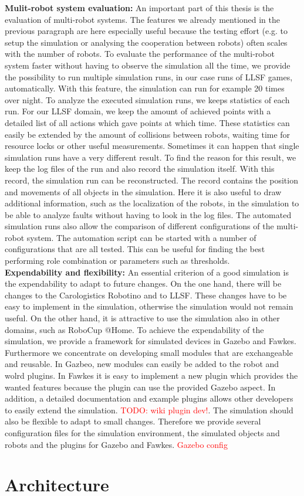 \textbf{Mulit-robot system evaluation:} An important part of this thesis is the evaluation of multi-robot systems. The features we already mentioned in the previous paragraph are here especially useful because the testing effort (e.g. to setup the simulation or analysing the cooperation between robots) often scales with the number of robots. To evaluate the performance of the multi-robot system faster without having to observe the simulation all the time, we provide the possibility to run multiple simulation runs, in our case runs of LLSF games, automatically. With this feature, the simulation can run for example 20 times over night. To analyze the executed simulation runs, we keeps statistics of each run. For our LLSF domain, we keep the amount of achieved points with a detailed list of all actions which gave points at which time. These statistics can easily be extended by the amount of collisions between robots, waiting time for resource locks or other useful measurements. Sometimes it can happen that single simulation runs have a very different result. To find the reason for this result, we keep the log files of the run and also record the simulation itself. With this record, the simulation run can be reconstructed. The record contains the position and movements of all objects in the simulation. Here it is also useful to draw additional information, such as the localization of the robots, in the simulation to be able to analyze faults without having to look in the log files. The automated simulation runs also allow the comparison of different configurations of the multi-robot system. The automation script can be started with a number of configurations that are all tested. This can be useful for finding the best performing role combination or parameters such as thresholds.\\
\textbf{Expendability and flexibility:} An essential criterion of a good simulation is the expendability to adapt to future changes. On the one hand, there will be changes to the Carologistics Robotino and to LLSF. These changes have to be easy to implement in the simulation, otherwise the simulation would not remain useful. On the other hand, it is attractive to use the simulation also in other domains, such as RoboCup @Home. To achieve the expendability of the simulation, we provide a framework for simulated devices in Gazebo and Fawkes. Furthermore we concentrate on developing small modules that are exchangeable and reusable. In Gazbeo, new modules can easily be added to the robot and wolrd plugins. In Fawkes it is easy to implement a new plugin which provides the wanted features because the plugin can use the provided Gazebo aspect. In addition, a detailed documentation and example plugins allows other developers to easily extend the simulation. \textcolor{red}{TODO: wiki plugin dev!}. The simulation should also be flexible to adapt to small changes. Therefore we provide several configuration files for the simulation environment, the simulated objects and robots and the plugins for Gazebo and Fawkes. \textcolor{red}{Gazebo config}



\section{Architecture}
